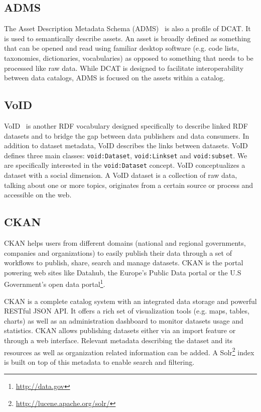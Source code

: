 \subsection{ADMS}
The Asset Description Metadata Schema (ADMS)~\cite{Archer:W3C:13} is also a profile of DCAT. It is used to semantically describe assets. An asset is broadly defined as something that can be opened and read using familiar desktop software (e.g. code lists, taxonomies, dictionaries, vocabularies) as opposed to something that needs to be processed like raw data. While DCAT is designed to facilitate interoperability between data catalogs, ADMS is focused on the assets within a catalog.

\subsection{VoID}
VoID~\cite{Bohm:WebSemJournal:11} is another RDF vocabulary designed specifically to describe linked RDF datasets and to bridge the gap between data publishers and data consumers. In addition to dataset metadata, VoID describes the links between datasets. VoID defines three main classes: \texttt{void:Dataset}, \texttt{void:Linkset} and \texttt{void:subset}. We are specifically interested in the \texttt{void:Dataset} concept. VoID conceptualizes a dataset with a social dimension. A VoID dataset is a collection of raw data, talking about one or more topics, originates from a certain source or process and accessible on the web.

\subsection{CKAN}
CKAN helps users from different domains (national and regional governments, companies and organizations) to easily publish their data through a set of workflows to publish, share, search and manage datasets. CKAN is the portal powering web sites like Datahub, the Europe's Public Data portal or the U.S Government's open data portal\footnote{\url{http://data.gov}}.

CKAN is a complete catalog system with an integrated data storage and powerful RESTful JSON API. It offers a rich set of visualization tools (e.g. maps, tables, charts) as well as an administration dashboard to monitor datasets usage and statistics. CKAN allows publishing datasets either via an import feature or through a web interface. Relevant metadata describing the dataset and its resources as well as organization related information can be added. A Solr\footnote{\url{http://lucene.apache.org/solr/}} index is built on top of this metadata to enable search and filtering.

